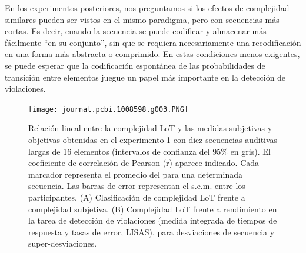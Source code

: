 En los experimentos posteriores, nos preguntamos si los efectos de complejidad similares pueden ser vistos en el mismo paradigma, pero con secuencias más cortas. Es decir, cuando la secuencia se puede codificar y almacenar más fácilmente ``en su conjunto'', sin que se requiera necesariamente una recodificación en una forma más abstracta o comprimido. En estas condiciones menos exigentes, se puede esperar que la codificación espontánea de las probabilidades de transición entre elementos juegue un papel más importante en la detección de violaciones.

\begin{figure}[t!]
      \texttt{[image: journal.pcbi.1008598.g003.PNG]}
      \centering
      \caption{Relación lineal entre la complejidad LoT y las medidas subjetivas y objetivas obtenidas en el experimento 1 con diez secuencias auditivas largas de 16 elementos (intervalos de confianza del 95\% en gris). El coeficiente de correlación de Pearson (r) aparece indicado. Cada marcador representa el promedio del para una determinada secuencia. Las barras de error representan el s.e.m. entre los participantes. (A) Clasificación de complejidad LoT frente a complejidad subjetiva. (B) Complejidad LoT frente a rendimiento en la tarea de detección de violaciones (medida integrada de tiempos de respuesta y tasas de error, LISAS), para desviaciones de secuencia y super-desviaciones.}
      \label{PlosBIO-F3}
\end{figure}


